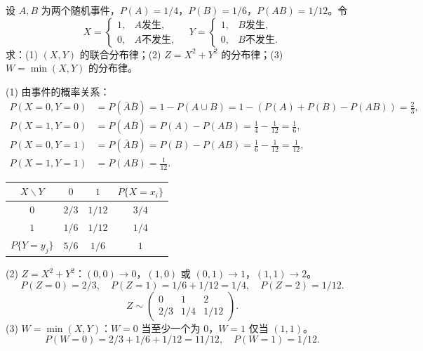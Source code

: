 \documentclass[lang=cn,11pt]{elegantbook}
\begin{document}
\begin{exercise}[事件的示性函数] \label{exer:3-d1}
设 $A,B$ 为两个随机事件，$P(A) = 1/4$，$P(B) = 1/6$，$P(AB) = 1/12$。令
\[
X = \begin{cases} 1, & A \text{发生}, \\ 0, & A \text{不发生}, \end{cases} \quad Y = \begin{cases} 1, & B \text{发生}, \\ 0, & B \text{不发生}. \end{cases}
\]
求：(1) $(X,Y)$ 的联合分布律；(2) $Z = X^2+Y^2$ 的分布律；(3) $W = \min(X,Y)$ 的分布律。
\end{exercise}
\begin{solution}
(1) 由事件的概率关系：
\begin{align*}
P(X=0,Y=0) &= P(\bar{A}\bar{B}) = 1 - P(A\cup B) = 1 - (P(A)+P(B)-P(AB)) = \frac{2}{3}, \\
P(X=1,Y=0) &= P(A\bar{B}) = P(A) - P(AB) = \frac{1}{4}-\frac{1}{12} = \frac{1}{6}, \\
P(X=0,Y=1) &= P(\bar{A}B) = P(B) - P(AB) = \frac{1}{6}-\frac{1}{12} = \frac{1}{12}, \\
P(X=1,Y=1) &= P(AB) = \frac{1}{12}.
\end{align*}
\begin{center}
\begin{tabular}{c|cc|c}
\toprule
$X \backslash Y$ & $0$ & $1$ & $P\{X=x_i\}$ \\
\midrule
$0$ & $2/3$ & $1/12$ & $3/4$ \\[4pt]
$1$ & $1/6$ & $1/12$ & $1/4$ \\
\midrule
$P\{Y=y_j\}$ & $5/6$ & $1/6$ & $1$ \\
\bottomrule
\end{tabular}
\end{center}
(2) $Z = X^2+Y^2$：$(0,0)\to 0$，$(1,0)$ 或 $(0,1)\to 1$，$(1,1)\to 2$。
\[
P(Z=0) = 2/3,\quad P(Z=1) = 1/6+1/12 = 1/4,\quad P(Z=2) = 1/12.
\]
\[
Z \sim \begin{pmatrix} 0 & 1 & 2 \\ 2/3 & 1/4 & 1/12 \end{pmatrix}.
\]
(3) $W = \min(X,Y)$：$W=0$ 当至少一个为 $0$，$W=1$ 仅当 $(1,1)$。
\[
P(W=0) = 2/3+1/6+1/12 = 11/12,\quad P(W=1) = 1/12.
\]
\end{solution}
\end{document}

